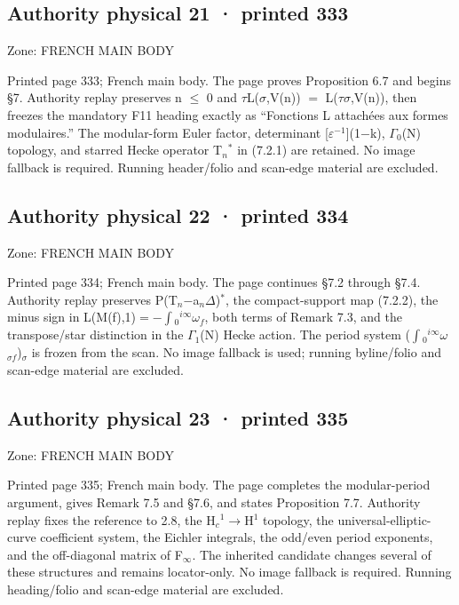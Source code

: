 \documentclass[10pt,twoside]{article}
\begin{document}
\subsection*{Authority physical 21 · printed 333}
\noindent\textsf{Zone: FRENCH MAIN BODY}\par
Printed page 333; French main body. The page proves Proposition 6.7 and begins \S{}7. Authority replay preserves n \ensuremath{≤} 0 and \ensuremath{τ}L(\ensuremath{σ},V(n)) \ensuremath{=} L(\ensuremath{τ}\ensuremath{σ},V(n)), then freezes the mandatory F11 heading exactly as “Fonctions L attachées aux formes modulaires.” The modular-form Euler factor, determinant [\ensuremath{ε}\ensuremath{^{-1}}](1\ensuremath{−}k), \ensuremath{Γ}\ensuremath{_{0}}(N) topology, and starred Hecke operator T\ensuremath{_{n}}\ensuremath{^{*}} in (7.2.1) are retained. No image fallback is required. Running header/folio and scan-edge material are excluded.\par
\subsection*{Authority physical 22 · printed 334}
\noindent\textsf{Zone: FRENCH MAIN BODY}\par
Printed page 334; French main body. The page continues \S{}7.2 through \S{}7.4. Authority replay preserves P(T\ensuremath{_{n}}\ensuremath{−}a\ensuremath{_{n}}\ensuremath{Δ})\ensuremath{^{*}}, the compact-support map (7.2.2), the minus sign in L(M(f),1)\ensuremath{=}\ensuremath{−}\ensuremath{∫}\ensuremath{_{0}}\ensuremath{^{i∞}}\ensuremath{ω}\ensuremath{_{f}}, both terms of Remark 7.3, and the transpose/star distinction in the \ensuremath{Γ}\ensuremath{_{1}}(N) Hecke action. The period system (\ensuremath{∫}\ensuremath{_{0}}\ensuremath{^{i∞}}\ensuremath{ω}\ensuremath{_{σf}})\ensuremath{_{σ}} is frozen from the scan. No image fallback is used; running byline/folio and scan-edge material are excluded.\par
\subsection*{Authority physical 23 · printed 335}
\noindent\textsf{Zone: FRENCH MAIN BODY}\par
Printed page 335; French main body. The page completes the modular-period argument, gives Remark 7.5 and \S{}7.6, and states Proposition 7.7. Authority replay fixes the reference to 2.8, the H\ensuremath{_{c}}\ensuremath{^{1}}\ensuremath{→}H\ensuremath{^{1}} topology, the universal-elliptic-curve coefficient system, the Eichler integrals, the odd/even period exponents, and the off-diagonal matrix of F\ensuremath{_{∞}}. The inherited candidate changes several of these structures and remains locator-only. No image fallback is required. Running heading/folio and scan-edge material are excluded.\par
\end{document}
